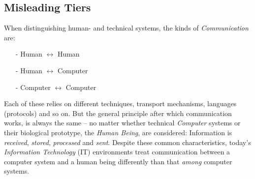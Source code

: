 %
%
%
%
%
%
%

\subsection{Misleading Tiers}
\label{misleading_tiers_heading}

When distinguishing human- and technical systems, the kinds of
\emph{Communication} are:

\begin{itemize}
    \item[-] Human $\leftrightarrow$ Human
    \item[-] Human $\leftrightarrow$ Computer
    \item[-] Computer $\leftrightarrow$ Computer
\end{itemize}

Each of these relies on different techniques, transport mechanisms, languages
(protocols) and so on. But the general principle after which communication
works, is always the same -- no matter whether technical \emph{Computer}
systems or their biological prototype, the \emph{Human Being}, are considered:
Information is \emph{received}, \emph{stored}, \emph{processed} and \emph{sent}.
Despite these common characteristics, today's \emph{Information Technology}
(IT) environments \cite{hellerkunze} treat communication between a computer
system and a human being differently than that \emph{among} computer systems.

